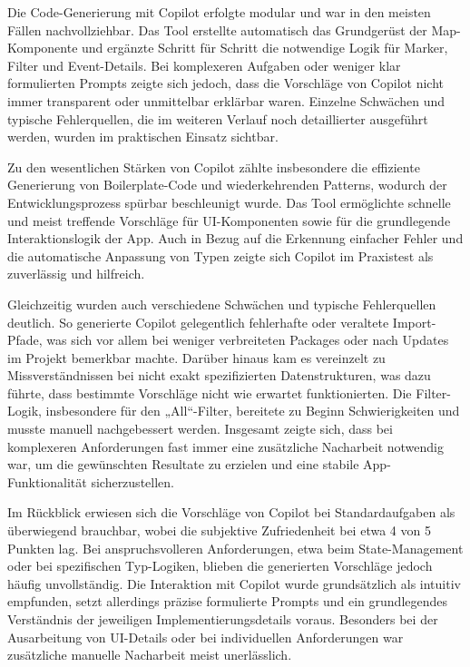 Die Code-Generierung mit Copilot erfolgte modular und war in den meisten Fällen
nachvollziehbar. Das Tool erstellte automatisch das Grundgerüst der
Map-Komponente und ergänzte Schritt für Schritt die notwendige Logik für
Marker, Filter und Event-Details. Bei komplexeren Aufgaben oder weniger klar
formulierten Prompts zeigte sich jedoch, dass die Vorschläge von Copilot nicht
immer transparent oder unmittelbar erklärbar waren. Einzelne Schwächen und
typische Fehlerquellen, die im weiteren Verlauf noch detaillierter ausgeführt
werden, wurden im praktischen Einsatz sichtbar.

Zu den wesentlichen Stärken von Copilot zählte insbesondere die effiziente
Generierung von Boilerplate-Code und wiederkehrenden Patterns, wodurch der
Entwicklungsprozess spürbar beschleunigt wurde. Das Tool ermöglichte schnelle
und meist treffende Vorschläge für UI-Komponenten sowie für die grundlegende
Interaktionslogik der App. Auch in Bezug auf die Erkennung einfacher Fehler und
die automatische Anpassung von Typen zeigte sich Copilot im Praxistest als
zuverlässig und hilfreich.

Gleichzeitig wurden auch verschiedene Schwächen und typische Fehlerquellen
deutlich. So generierte Copilot gelegentlich fehlerhafte oder veraltete
Import-Pfade, was sich vor allem bei weniger verbreiteten Packages oder nach
Updates im Projekt bemerkbar machte. Darüber hinaus kam es vereinzelt zu
Missverständnissen bei nicht exakt spezifizierten Datenstrukturen, was dazu
führte, dass bestimmte Vorschläge nicht wie erwartet funktionierten. Die
Filter-Logik, insbesondere für den „All“-Filter, bereitete zu Beginn
Schwierigkeiten und musste manuell nachgebessert werden. Insgesamt zeigte sich,
dass bei komplexeren Anforderungen fast immer eine zusätzliche Nacharbeit
notwendig war, um die gewünschten Resultate zu erzielen und eine stabile
App-Funktionalität sicherzustellen.

Im Rückblick erwiesen sich die Vorschläge von Copilot bei Standardaufgaben als
überwiegend brauchbar, wobei die subjektive Zufriedenheit bei etwa 4 von 5
Punkten lag. Bei anspruchsvolleren Anforderungen, etwa beim State-Management
oder bei spezifischen Typ-Logiken, blieben die generierten Vorschläge jedoch
häufig unvollständig. Die Interaktion mit Copilot wurde grundsätzlich als
intuitiv empfunden, setzt allerdings präzise formulierte Prompts und ein
grundlegendes Verständnis der jeweiligen Implementierungsdetails voraus.
Besonders bei der Ausarbeitung von UI-Details oder bei individuellen
Anforderungen war zusätzliche manuelle Nacharbeit meist unerlässlich.

